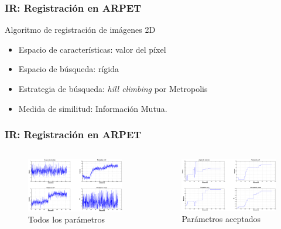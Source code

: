 \documentclass{beamer} %
\begin{document}
\begin{frame}
\frametitle{IR: Registración en ARPET}

Algoritmo de registración de imágenes 2D

\begin{itemize}
\pause
\item Espacio de características: valor del píxel
\pause
\item Espacio de búsqueda: rígida
\pause
\item Estrategia de búsqueda: \textit{hill climbing} por Metropolis
\pause
\item Medida de similitud: Información Mutua.
\end{itemize}

\end{frame}

\begin{frame}
\frametitle{IR: Registración en ARPET}

\begin{columns}[onlytextwidth]
\begin{column}{.5\textwidth}
\begin{figure}
  \includegraphics[width=\textwidth]{images/7-all.eps}
  \caption{Todos los parámetros}
\end{figure}
\end{column}
\hfill
\begin{column}{.5\textwidth}
\begin{figure}
  \includegraphics[width=\textwidth]{images/7-accepted.eps}
  \caption{Parámetros aceptados}
\end{figure}
\end{column}
\end{columns}

\end{frame}
\end{document}
